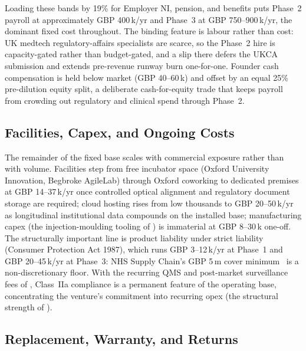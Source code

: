 Loading these bands by 19\% for Employer NI, pension, and benefits puts Phase~2 payroll at approximately GBP 400\,k/yr and Phase~3 at GBP 750--900\,k/yr, the dominant fixed cost throughout. The binding feature is labour rather than cost: UK medtech regulatory-affairs specialists are scarce, so the Phase~2 hire is capacity-gated rather than budget-gated, and a slip there defers the UKCA submission and extends pre-revenue runway burn one-for-one. Founder cash compensation is held below market (GBP 40--60\,k) and offset by an equal 25\% pre-dilution equity split, a deliberate cash-for-equity trade that keeps payroll from crowding out regulatory and clinical spend through Phase~2.

\subsection{Facilities, Capex, and Ongoing Costs}
\label{sec:ent-ops-facilities}
\label{sec:ent-ops-insurance}

The remainder of the fixed base scales with commercial exposure rather than with volume. Facilities step from free incubator space (Oxford University Innovation, Begbroke AgileLab) through Oxford coworking to dedicated premises at GBP 14--37\,k/yr once controlled optical alignment and regulatory document storage are required; cloud hosting rises from low thousands to GBP 20--50\,k/yr as longitudinal institutional data compounds on the installed base; manufacturing capex (the injection-moulding tooling of ) is immaterial at GBP 8--30\,k one-off. The structurally important line is product liability under strict liability (Consumer Protection Act 1987), which runs GBP 3--12\,k/yr at Phase~1 and GBP 20--45\,k/yr at Phase~3: NHS Supply Chain's GBP 5\,m cover minimum~\cite{nhs-supply-chain-insurance} is a non-discretionary floor. With the recurring QMS and post-market surveillance fees of , Class~IIa compliance is a permanent feature of the operating base, concentrating the venture's commitment into recurring opex (the structural strength of ).


\subsection{Replacement, Warranty, and Returns}
\label{sec:ent-ops-warranty}

